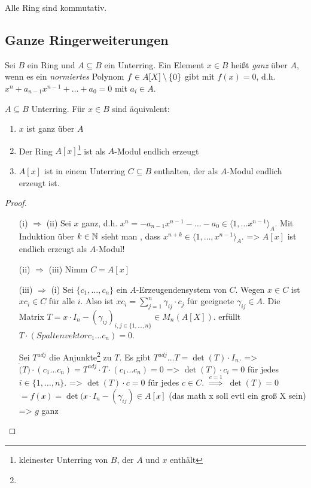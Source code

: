 \documentclass[../main.tex]{subfiles}
\begin{document}
Alle Ring sind kommutativ.
\subsection{Ganze Ringerweiterungen}
\begin{definition}
    Sei $B$ ein Ring und $A\subseteq B$ ein Unterring. Ein Element $x\in B$ heißt \emph{ganz} über $A$, wenn es ein \emph{normiertes} Polynom $f\in A[X]\setminus \{0\}$ gibt mit $f(x)=0$, d.h. $x^n + a_{n-1}x^{n-1} + \dots + a_0 = 0$ mit $a_i\in A$.
\end{definition}
\begin{theorem}
    $A\subseteq B$ Unterring. Für $x\in B$ sind äquivalent:
    \begin{enumerate}[label=(\roman*)]
        \item $x$ ist ganz über $A$
        \item Der Ring $A[x]$\footnote{kleinester Unterring von $B$, der $A$ und $x$ enthält} ist als $A$-Modul endlich erzeugt
        \item $A[x]$ ist in einem Unterring $C\subseteq B$ enthalten, der als $A$-Modul endlich erzeugt ist.
    \end{enumerate}
\end{theorem}
\begin{proof}
    \begin{itemize}
        \item[(i) $\Rightarrow$ (ii)]
        Sei $x$ ganz, d.h. $x^n = -a_{n-1}x^{n-1}-\dots - a_0\in \langle1,\dots x^{n-1}\rangle_A$.
        Mit Induktion über $k\in \mathbb{N}$ sieht man , dass $x^{n+k}\in \langle 1,\dots, x^{n-1}\rangle_A$.
        => $A[x]$ ist endlich erzeugt als $A$-Modul!
        \item[(ii) $\Rightarrow$ (iii)]
        Nimm $C = A[x]$
        \item[(iii) $\Rightarrow$ (i)]
        Sei $\{c_1,\dots,c_n\}$ ein $A$-Erzeugendensystem von $C$.
        Wegen $x\in C$ ist $xc_i\in C$ für alle $i$.
        Also ist $xc_i= \sum_{j=1}^n \gamma_{ij}\cdot c_j$ für geeignete $\gamma_{ij}\in A$.
        Die Matrix $T = x\cdot I_n- (\gamma_{ij})_{i,j\in \{1,\dots,n\}}\in M_n(A[X])$.
        erfüllt $T\cdot (Spaltenvektor c_1 \dots c_n) = 0$.

        Sei $T^{adj}$ die Anjunkte\footnote{\TODO[Definition :D]} zu $T$.
        Es gibt $T^{adj}\dots T = \det(T)\cdot I_n$.
        => $\dot(T)\cdot (c_1 \dots c_n) = T^{adj} \cdot T\cdot (c_1\dots c_n) = 0$
        => $\det(T)\cdot c_i = 0$ für jedes $i\in \{1,\dots,n\}$.
        => $\det(T)\cdot c = 0$ für jedes $c\in C$.
        $\overset{c=1}{\Rightarrow}$ $\det(T) = 0$
        $= f(\mathcal{x}) = \det(\mathcal{x}\cdot I_n - (\gamma_{ij})\in A[\mathcal{x}]$ (das math x soll evtl ein groß X sein)
        => $g$ ganz
    \end{itemize}
\end{proof}
\end{document}

